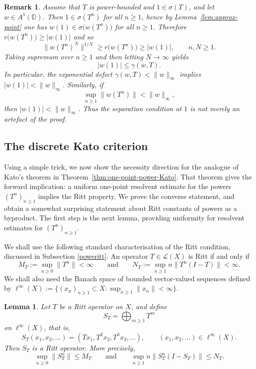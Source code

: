 \documentclass[11pt]{amsart}
\numberwithin{equation}{section}
\newtheorem{lemma}[theorem]{Lemma}
\newtheorem{remark}[theorem]{Remark}
\theoremstyle{definition}
\theoremstyle{plain}
\def\D{\mathbb{D}}
\begin{document}
\begin{remark}\label{rem:w1-from-gamma}
Assume that $T$ is power-bounded and $1\in\sigma(T)$,
and let $w\in A^{1}(\D)$. Then $1\in\sigma(T^n)$ for all $n\ge1$, hence by Lemma~\ref{lem:approx-point}
one has
$w(1)\in\sigma\!\bigl(w(T^n)\bigr)$ for all $n\ge1.$
Therefore $r\!\bigl(w(T^n)\bigr)\ge |w(1)|$ and so
\[
\|w(T^n)^N\|^{1/N}\ge r\!\bigl(w(T^n)\bigr)\ge |w(1)|, \qquad n,N\ge1.
\]
Taking supremum over $n\ge1$ and then letting $N\to\infty$ yields
\[
        |w(1)|\le \gamma(w,T).
\]
In particular, the exponential defect
\(
        \gamma(w,T)<\|w\|_\infty
\)
implies
\(
        |w(1)|<\|w\|_\infty.
\)
Similarly, if
\[
        \sup_{n\ge1}\|w(T^n)\|<\|w\|_\infty,
\]
then $|w(1)|<\|w\|_\infty$.  Thus the separation condition at $1$ is not
merely an artefact of the proof.
\end{remark}




\subsection{The discrete Kato criterion}



Using a simple trick, we now show the necessity direction for the analogue of
Kato's theorem in Theorem~\ref{thm:one-point-power-Kato}.  That theorem gives
the forward implication: a uniform one-point resolvent estimate for the powers
$(T^n)_{n \ge 1}$ implies the Ritt property.  We prove the converse statement, and obtain
a somewhat surprising statement about Ritt constants of powers as a byproduct.
The
first step is the next lemma, providing uniformity for resolvent estimates for
$(T^n)_{n \ge 1}$.

We shall use the following standard characterisation of the Ritt condition, discussed in Subsection \ref{poweritt}.  An
operator \(T\in \mathcal L(X)\) is Ritt if and only if
\[
  M_T:=\sup_{n\ge 0}\|T^n\|<\infty
\qquad \text{and} \qquad
  N_T:=\sup_{n\ge 1} n\|T^n(I-T)\|<\infty.
\]
We shall also need the Banach space of bounded vector-valued sequences defined by $\ell^\infty(X):=\{(x_n)_{n \ge 1}\subset X: \sup_{n \ge 1}\|x_n\|<\infty\}.$
\begin{lemma}\label{lem:direct-sum-powers-ritt}
Let $T$ be a Ritt operator on $X$, and define
\[
  S_T=\bigoplus_{m\ge1}T^m
\]
on $\ell^\infty(X)$, that is,
\[
  S_T(x_1,x_2,\ldots)=(Tx_1,T^2x_2,T^3x_3,\ldots), \qquad (x_1,x_2,\ldots) \in \ell^\infty(X).
\]
Then $S_T$ is a Ritt operator. More precisely,
\[
  \sup_{n\ge0}\|S_T^n\|\le M_T
\qquad \text{and} \qquad
  \sup_{n\ge1} n\|S_T^n(I-S_T)\|\le N_T.
\]
\end{lemma}
\end{document}
